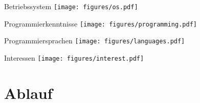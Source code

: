 
\begin{frame}{Betriebssystem}
  \centering
  \texttt{[image: figures/os.pdf]}
\end{frame}

\begin{frame}{Programmierkenntnisse}
  \centering
  \texttt{[image: figures/programming.pdf]}
\end{frame}

\begin{frame}{Programmiersprachen}
  \centering
  \texttt{[image: figures/languages.pdf]}
\end{frame}

\begin{frame}{Interessen}
  \centering
  \texttt{[image: figures/interest.pdf]}
\end{frame}

\section{Ablauf}

